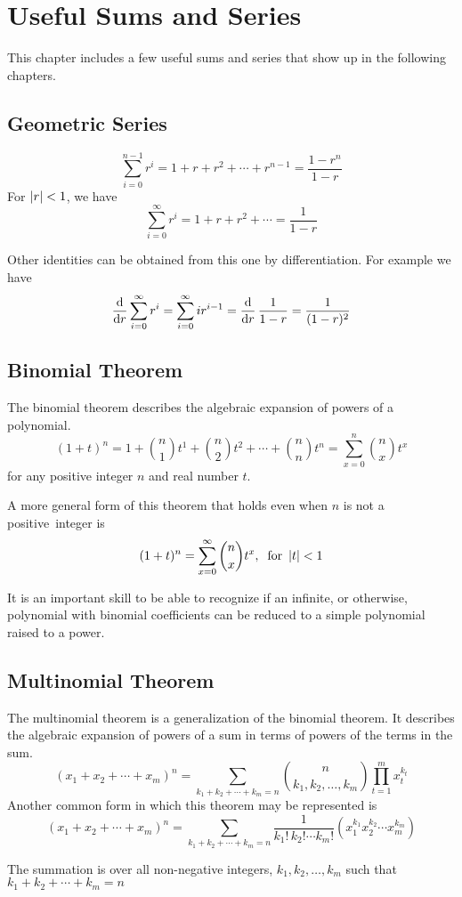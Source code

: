 \chapter{Useful Sums and Series}
This chapter includes a few useful sums and series that show up in the following chapters.
\section{Geometric Series}
\[
    \sum_{i = 0}^{n-1} r^i = 1 + r + r^2 + \cdots + r^{n-1} = \frac{1-r^n}{1-r}
\]
For $\left|r\right| < 1$, we have
\[
    \sum_{i = 0}^{\infty} r^i = 1 + r + r^2 + \cdots = \frac{1}{1-r}
\]
\begin{info}
Other identities can be obtained from this one by differentiation. For example we have
\[
    \frac{\operatorname{d}\!{}}{\operatorname{d}\!{r}}\sum_{i = 0}^{\infty} r^i = \sum_{i = 0}^{\infty} ir^{i-1} = \frac{\operatorname{d}\!{}}{\operatorname{d}\!{r}}\,\frac{1}{1-r} = \frac{1}{(1-r)^2}
\]
\end{info}
\section{Binomial Theorem}
The binomial theorem describes the algebraic expansion of powers of a polynomial.
\[
    (1 + t)^n = 1 + \binom{n}{1}t^1 + \binom{n}{2}t^2 + \cdots + \binom{n}{n}t^n = \sum_{x = 0}^{n} \binom{n}{x} t^x
\]
for any positive integer $n$ and real number $t$.
\par\smallskip
A more general form of this theorem that holds even when $n$ is not a positive~integer is
\[
    (1 + t)^n = \sum_{x = 0}^{\infty} \binom{n}{x} t^x,\:\text{ for } \left|t\right| < 1
\]
\begin{info}
It is an important skill to be able to recognize if an infinite, or otherwise, polynomial with binomial coefficients can be reduced to a simple polynomial raised to a power.
\end{info}
\section{Multinomial Theorem}
The multinomial theorem is a generalization of the binomial theorem. It describes the algebraic expansion of powers of a sum in terms of powers of the terms in the sum.
\[
    (x_1 + x_2 + \cdots + x_m)^n = \sum_{k_1 + k_2 + \cdots + k_m = n} \binom{n}{k_1,k_2,\ldots,k_m} \prod_{t = 1}^{m} x_t^{k_t}
\]
Another common form in which this theorem may be represented is
\[
    (x_1 + x_2 + \cdots + x_m)^n 
    = \sum_{k_1 + k_2 + \cdots + k_m = n} \frac{1}{k_1!\,k_2!\cdots k_m!}(x_1^{k_1}x_2^{k_2}\cdots x_m^{k_m})
\]
\begin{info}
The summation is over all non-negative integers, $k_1,k_2,\ldots,k_m$ such that $k_1 + k_2 + \cdots + k_m = n$
\end{info}